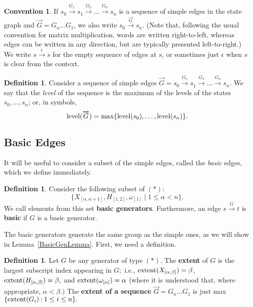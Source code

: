 \documentclass{dalthesis}
\theoremstyle{theorem}
\theoremstyle{definition}
\newtheorem{definition}[theorem]{Definition}
\theoremstyle{definition}  %
\theoremstyle{definition}
\newtheorem{convention}{Convention}
\renewcommand{\:}{\mathbin{:}}
\newcommand{\level}{\mathop{\rm level}\nolimits}
\newcommand{\extent}{\mathop{\rm extent}\nolimits}
\newcommand{\edge}{\xrightarrow}
\renewcommand{\vec}{\overrightarrow}
\newcommand{\s}[1]{\{#1\}}
\begin{document}
\begin{convention}
\label{EdgeConv}
  If $s_0\edge{G_1} s_1\edge{G_2} \ldots \edge{G_n} s_n$ is a sequence of simple edges in the state graph and $\vec{G} = G_n\ldots G_1$, we also write $s_0\edge{\vec{G}}s_n$. (Note that, following the usual convention for matrix multiplication, words are written right-to-left, whereas edges can be written in any direction, but are typically presented left-to-right.) We write $s\edge{\epsilon}s$ for the empty sequence of edges at $s$, or sometimes just $\epsilon$ when $s$ is clear from the context.
\end{convention}

\begin{definition}
\label{SequenceLevelDef}
  Consider a sequence of simple edges $\vec{G} = s_0\edge{G_1}
  s_1\edge{G_2} \ldots \edge{G_n} s_n$. We say that the {\em level}
  of the sequence is the maximum of the levels of the states
  $s_0,\ldots,s_n$; or, in symbols,
  \[ \level(\vec G) = \max \s{\level(s_0),\ldots,\level(s_n)}.
  \]
\end{definition}

\subsection{Basic Edges}

It will be useful to consider a subset of the simple edges, called the \textit{basic} edges, which we define immediately.

\begin{definition}
\label{BasicDef}
Consider the following subset of $(*)$: \[
\{X_{[\alpha,\alpha+1]},H_{[1,2]},\omega_{[1]}\mid 1\leq\alpha < n\}.
\]
We call elements from this set \textbf{basic generators}. Furthermore, an edge $s\edge{G}t$ is \textbf{basic} if $G$ is a basic generator.
\end{definition}

The basic generators generate the same group as the simple ones, as we will show in Lemma~\ref{BasicGenLemma}. First, we need a definition.

\begin{definition}
\label{ExtentDef}
Let $G$ be any generator of type $(*).$ The \textbf{extent} of $G$ is the largest subscript index appearing in $G;$ i.e., $\extent(X_{[\alpha,\beta]})=\beta$, $\extent(H_{[\alpha,\beta]})=\beta,$ and $\extent(\omega_{[\alpha]})=\alpha$ (where it is understood that, where appropriate, $\alpha < \beta.)$ The \textbf{extent of a sequence} $\vec{G} = G_n\ldots G_1$ is just max$\{\extent(G_i)\:1\leq i\leq n\}.$
\end{definition}
\end{document}
